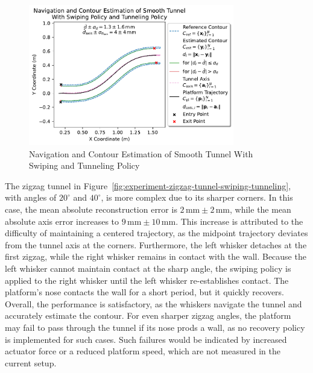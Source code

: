 \begin{figure}[!htb]
    \centering
    \includegraphics[width=0.8\textwidth]{figures/experiments/smooth-tunnel-swiping-tunneling}
    \caption{Navigation and Contour Estimation of Smooth Tunnel With Swiping and Tunneling Policy}
    \label{fig:experiment-smooth-tunnel-swiping-tunneling}
\end{figure}

The zigzag tunnel in Figure~\ref{fig:experiment-zigzag-tunnel-swiping-tunneling}, with angles of $20^\circ$ and $40^\circ$, is more complex due to its sharper corners.
In this case, the mean absolute reconstruction error is $2\,\text{mm} \pm 2\,\text{mm}$, while the mean absolute axis error increases to $9\,\text{mm} \pm 10\,\text{mm}$.
This increase is attributed to the difficulty of maintaining a centered trajectory, as the midpoint trajectory deviates from the tunnel axis at the corners.
Furthermore, the left whisker detaches at the first zigzag, while the right whisker remains in contact with the wall.
Because the left whisker cannot maintain contact at the sharp angle, the swiping policy is applied to the right whisker until the left whisker re-establishes contact.
The platform's nose contacts the wall for a short period, but it quickly recovers.
Overall, the performance is satisfactory, as the whiskers navigate the tunnel and accurately estimate the contour.
For even sharper zigzag angles, the platform may fail to pass through the tunnel if its nose prods a wall, as no recovery policy is implemented for such cases.
Such failures would be indicated by increased actuator force or a reduced platform speed, which are not measured in the current setup.

